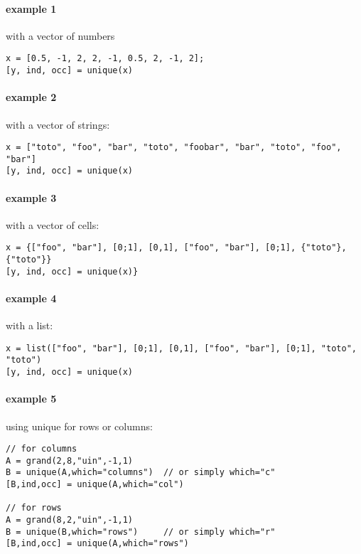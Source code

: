 \begin{examples}

\paragraph{example 1} with a vector of numbers
\begin{Verbatim}
x = [0.5, -1, 2, 2, -1, 0.5, 2, -1, 2];
[y, ind, occ] = unique(x)
\end{Verbatim}

\paragraph{example 2} with a vector of strings:
\begin{Verbatim}
x = ["toto", "foo", "bar", "toto", "foobar", "bar", "toto", "foo", "bar"]
[y, ind, occ] = unique(x)
\end{Verbatim}

\paragraph{example 3} with a vector of cells:
\begin{Verbatim}
x = {["foo", "bar"], [0;1], [0,1], ["foo", "bar"], [0;1], {"toto"}, {"toto"}}
[y, ind, occ] = unique(x)}
\end{Verbatim}

\paragraph{example 4} with a list:
\begin{Verbatim}
x = list(["foo", "bar"], [0;1], [0,1], ["foo", "bar"], [0;1], "toto", "toto")
[y, ind, occ] = unique(x)
\end{Verbatim}

\paragraph{example 5} using unique for rows or columns:
\begin{Verbatim}
// for columns
A = grand(2,8,"uin",-1,1)
B = unique(A,which="columns")  // or simply which="c"
[B,ind,occ] = unique(A,which="col")

// for rows
A = grand(8,2,"uin",-1,1)
B = unique(B,which="rows")     // or simply which="r"
[B,ind,occ] = unique(A,which="rows")
\end{Verbatim}



\end{examples}

